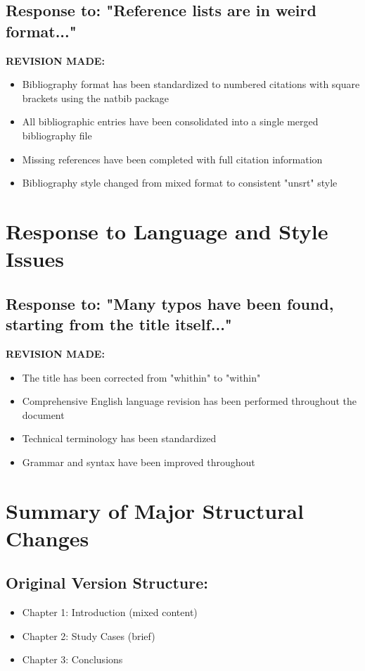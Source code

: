 \documentclass[11pt,a4paper]{article}
\begin{document}
\subsection{Response to: "Reference lists are in weird format..."}

\textbf{REVISION MADE:}
\begin{itemize}
\item Bibliography format has been standardized to numbered citations with square brackets using the natbib package
\item All bibliographic entries have been consolidated into a single merged bibliography file
\item Missing references have been completed with full citation information
\item Bibliography style changed from mixed format to consistent "unsrt" style
\end{itemize}

\section{Response to Language and Style Issues}

\subsection{Response to: "Many typos have been found, starting from the title itself..."}

\textbf{REVISION MADE:}
\begin{itemize}
\item The title has been corrected from "whithin" to "within"
\item Comprehensive English language revision has been performed throughout the document
\item Technical terminology has been standardized
\item Grammar and syntax have been improved throughout
\end{itemize}

\section{Summary of Major Structural Changes}

\subsection{Original Version Structure:}
\begin{itemize}
\item Chapter 1: Introduction (mixed content)
\item Chapter 2: Study Cases (brief)
\item Chapter 3: Conclusions
\end{itemize}
\end{document}
